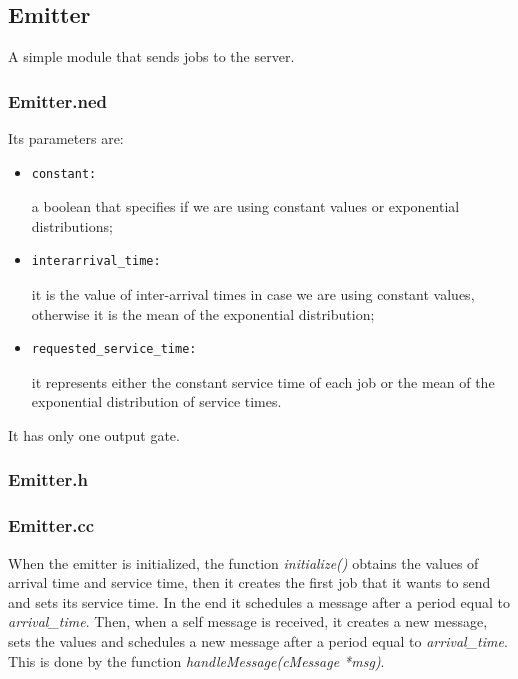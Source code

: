 \documentclass{article}
\begin{document}
    \subsection{Emitter}
        A simple module that sends jobs to the server. 
        
        \subsubsection{Emitter.ned}
        Its parameters are:
        \begin{itemize}
            \item 
            \begin{verbatim}constant:\end{verbatim}
            a boolean that specifies if we are using constant values or exponential distributions;
            \item 
            \begin{verbatim}interarrival_time:\end{verbatim}
            it is the value of inter-arrival times in case we are using constant values, otherwise it is the mean of the exponential distribution;
            \item 
            \begin{verbatim}requested_service_time:\end{verbatim}
            it represents either the constant service time of each job or the mean of the exponential distribution of service times.
        \end{itemize}
        It has only one output gate.
        
        
        \subsubsection{Emitter.h}
        
        
        \newpage
        \subsubsection{Emitter.cc}
        When the emitter is initialized, the function \textit{initialize()} obtains the values of arrival time and service time, then it creates the first job that it wants to send and sets its service time. In the end it schedules a message after a period equal to \textit{arrival\_time}.
        \newline
        Then, when a self message is received, it creates a new message, sets the values and schedules a new message after a period equal to \textit{arrival\_time}. This is done by the function \textit{handleMessage(cMessage *msg)}.
        
    
\end{document}
